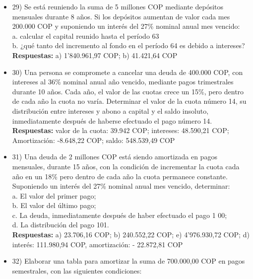 \begin{itemize}
 \item 29)	 Se está reuniendo la suma de 5 millones COP mediante depósitos mensuales durante 8 años. Si los depósitos aumentan de valor cada mes 200.000 COP y suponiendo un interés del 27\% nominal anual mes vencido:\\

       a.	calcular el capital reunido hasta el período 63 \\
       b.	¿qué tanto del incremento al fondo en el período 64 es debido a intereses? \\
       \textbf{Respuestas: }a) 1'840.961,97 COP;  b) 41.421,64 COP
       \medskip

 \item 30)	 Una persona se compromete a cancelar una deuda de 400.000 COP, con intereses al 36\% nominal anual año vencido, mediante pagos trimestrales durante 10 años. Cada año, el valor de las cuotas crece un 15\%, pero dentro de cada año la cuota no varía. Determinar el valor de la cuota número 14, su distribución entre intereses y abono a capital y el saldo insoluto, inmediatamente después de haberse efectuado el pago número 14.\\
       \textbf{Respuestas:} valor de la cuota: 39.942 COP; 	intereses: 48.590,21 COP;
       Amortización: -8.648,22 COP;       saldo: 548.539,49 COP\\
       \medskip
 \item 31)	 Una deuda de 2 millones COP está siendo amortizada en pagos mensuales, durante 15 años, con la condición de incrementar la cuota cada año en un 18\% pero dentro de cada año la cuota permanece constante. Suponiendo un interés del 27\% nominal anual mes vencido, determinar:\\

       a.	El valor del primer pago; \\
       b.	El valor del último pago; \\
       c.	La deuda, inmediatamente después de haber efectuado el pago 1 00; \\
       d.	La distribución del pago 101. \\
       \textbf{Respuestas: }a) 23.706,16 COP;	 b) 240.552,22 COP; 	e) 4'976.930,72 COP;
       d) interés: 111.980,94 COP, amortización: - 22.872,81 COP
       \medskip

 \item 32)	 Elaborar una tabla para amortizar la suma de 700.000,00 COP en pagos semestrales, con las siguientes condiciones:\\


\end{itemize}
